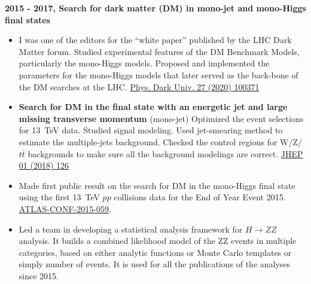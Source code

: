 \noindent\textbf{2015 - 2017, Search for dark matter (DM) in mono-jet and mono-Higgs final states}
\begin{itemize}
    \item I was one of the editors for the ``white paper'' published by the LHC Dark Matter forum. 
        Studied experimental features of the DM Benchmark Models, 
        particularly the mono-Higgs models. 
        Proposed and implemented the parameters for the mono-Higgs models
        that later served as the back-bone of the DM searches at the LHC.
        \href{https://www.sciencedirect.com/science/article/pii/S2212686419301712}{Phys. Dark Univ. 27 (2020) 100371}
    \item  \textbf{Search for DM in the final state with an energetic jet and large missing transverse momentum} (mono-jet) \newline
        Optimized the event selections for 13~TeV data. 
        Studied signal modeling. 
        Used jet-smearing method to estimate
        the multiple-jets background.
        Checked the control regions for W/Z/$t\bar{t}$ backgrounds to make sure
        all the background modelings are correct.
        \href{https://link.springer.com/article/10.1007/JHEP01(2018)126}{JHEP 01 (2018) 126}
    \item Made first public result on the search for DM in the mono-Higgs final state using the 
        first 13~TeV $pp$ collisions data for the End of Year Event 2015.
        \href{https://atlas.web.cern.ch/Atlas/GROUPS/PHYSICS/CONFNOTES/ATLAS-CONF-2015-059}{ATLAS-CONF-2015-059}.
        
        
    \item Led a team in developing a statistical analysis framework for $H\to ZZ$ analysis.
        It builds a combined likelihood model of the 
        ZZ events in multiple categories, based on either analytic functions or Monte 
        Carlo templates or simply number of events. It is used for all 
        the publications of the \llll analyses since 2015.
\end{itemize}

